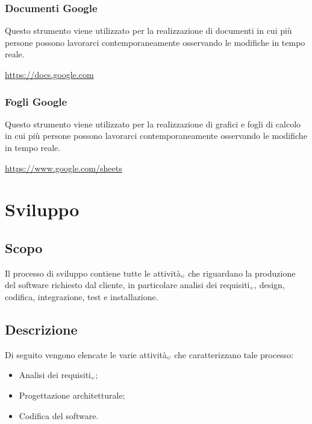 \subsubsection{Documenti Google}\label{ProcessiPrimariFornituraStrumentiDocumentiGoogle}
Questo strumento viene utilizzato per la realizzazione di documenti in cui più persone possono lavorarci contemporaneamente osservando le modifiche in tempo reale.
\begin{center}
	\url{https://docs.google.com}
\end{center}
\subsubsection{Fogli Google}\label{ProcessiPrimariFornituraStrumentiFogliGoogle}
Questo strumento viene utilizzato per la realizzazione di grafici e fogli di calcolo in cui più persone possono lavorarci contemporaneamente osservando le modifiche in tempo reale.
\begin{center}
	\url{https://www.google.com/sheets}
\end{center}


\section{Sviluppo}\label{ProcessiPrimariSviluppo}
\subsection{Scopo}\label{ProcessiPrimariScopo}
Il processo di sviluppo contiene tutte le attività$_{\scaleto{G}{3pt}}$ che riguardano la produzione del software richiesto dal cliente, in particolare analisi dei requisiti$_{\scaleto{G}{3pt}}$, design, codifica, integrazione, test e installazione.
\subsection{Descrizione}\label{ProcessiPrimariDescrizione}
Di seguito vengono elencate le varie attività$_{\scaleto{G}{3pt}}$ che caratterizzano tale processo:
\begin{itemize}
	\item Analisi dei requisiti$_{\scaleto{G}{3pt}}$;
	\item Progettazione architetturale;
	\item Codifica del software.
\end{itemize}
